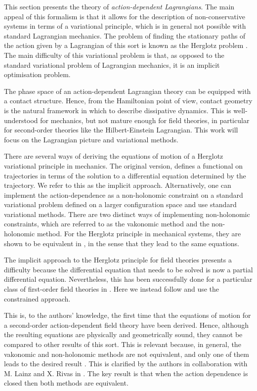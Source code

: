 \documentclass[../main.tex]{subfiles}
\begin{document}
This section presents the theory of \emph{action-dependent Lagrangians}. The main appeal of
this formalism is that it allows for the description of non-conservative systems in terms of a
variational principle, which is in general not possible with standard Lagrangian
mechanics. The problem of finding the stationary paths of the action given by a Lagrangian of this sort is known as the Herglotz problem \cite{Herglotz_1930}. The main difficulty of this variational
problem is that, as opposed to the standard variational problem of Lagrangian mechanics,
it is an implicit optimisation problem. 

The phase space of an action-dependent Lagrangian theory can be equipped with a contact structure. Hence, from the Hamiltonian point of view, contact geometry is the natural framework in which to describe dissipative dynamics. This is well-understood for mechanics, but not mature enough for field theories, in particular for  second-order theories like the Hilbert-Einstein Lagrangian. This work will focus on the Lagrangian picture and variational methods.

There are several ways of deriving the equations of motion of a Herglotz variational principle in mechanics. The original version, defines a functional on trajectories in terms of the solution to a differential equation determined by the trajectory. We refer to this as the implicit approach. Alternatively, one can implement the action-dependence as a non-holonomic constraint on a standard variational problem defined on a larger configuration space and use standard variational methods. There are two distinct ways of implementing non-holonomic constraints, which are referred to as the vakonomic method and the non-holonomic method. For the Herglotz principle in mechanical systems, they are shown to be equivalent in \cite{de_leon_constrained_2021}, in the sense that they lead to the same equations.

The implicit approach to the Herglotz principle for field theories presents a difficulty because the differential equation that needs to be solved is now a partial differential equation. Nevertheless, this has been successfully done for a particular class of first-order field theories  in \cite{Georgieva, Lazo2018}. Here we instead follow \cite{de_leon_constrained_2021} and use the constrained approach.

This is, to the authors' knowledge, the first time that the equations of motion for a second-order action-dependent field theory have been derived. Hence, although the resulting equations are physically and geometrically sound, they cannot be compared to other results of this sort. This is relevant because, in general, the vakonomic and non-holonomic methods are not equivalent, and only one of them leads to the desired result \cite{Gra2003}. This is clarified by the authors in collaboration with M. Lainz and X. Rivas in \cite{GLMR-2022}. The key result is that when the action dependence is closed then both methods are equivalent.
\end{document}
